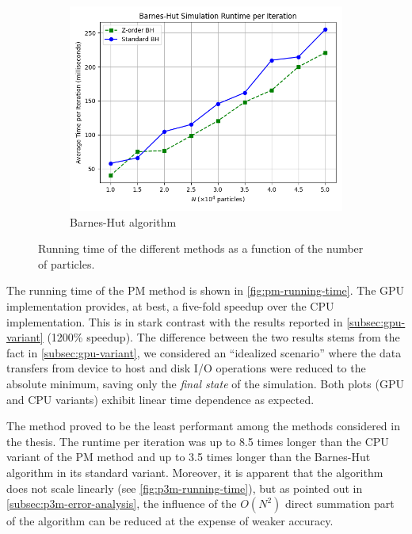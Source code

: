 \begin{figure}[!ht]
    \vspace{1em}

    \begin{subfigure}[b]{0.48\textwidth}
        \centering
        \includegraphics[width=\linewidth]{chapters/results/img/perf/bh_time.png}
        \caption{Barnes-Hut algorithm}
        \label{fig:bh-running-time}
    \end{subfigure}

    \caption{Running time of the different methods as a function of the number of particles.}
    \label{fig:method-running-time-comparison}
\end{figure}

The running time of the PM method is shown in \autoref{fig:pm-running-time}.
The GPU implementation provides, at best, a five-fold speedup over the CPU implementation.
This is in stark contrast with the results reported in \autoref{subsec:gpu-variant} (1200\% speedup).
The difference between the two results stems from the fact in \autoref{subsec:gpu-variant}, we considered an ``idealized scenario'' where the data transfers from device to host and disk I/O operations were reduced to the absolute minimum, saving only the \textit{final state} of the simulation.
Both plots (GPU and CPU variants) exhibit linear time dependence as expected.

The \PThreeM{} method proved to be the least performant among the methods considered in the thesis.
The runtime per iteration was up to 8.5 times longer than the CPU variant of the PM method and up to 3.5 times longer than the Barnes-Hut algorithm in its standard variant.
Moreover, it is apparent that the algorithm does not scale linearly (see \autoref{fig:p3m-running-time}), but as pointed out in \autoref{subsec:p3m-error-analysis}, the influence of the $O(N^2)$ direct summation part of the algorithm can be reduced at the expense of weaker accuracy.

